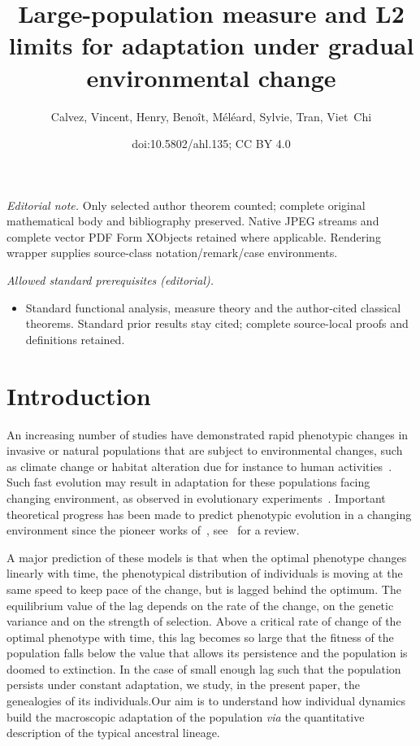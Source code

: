 \documentclass[10pt]{amsart}
\title{Large-population measure and L2 limits for adaptation under gradual environmental change}
\author{Calvez, Vincent, Henry, Benoît, Méléard, Sylvie, Tran, Viet Chi}
\date{doi:10.5802/ahl.135; CC BY 4.0}
\theoremstyle{definition}\newtheorem{defi}[theo]{Definition}\newtheorem{rema}[theo]{Remark}\newtheorem{exam}[theo]{Example}\newtheorem{exem}[theo]{Example}\newtheorem{nota}[theo]{Notation}
\begin{document}
\maketitle
\noindent\textit{Editorial note.} Only selected author theorem counted; complete original mathematical body and bibliography preserved. Native JPEG streams and complete vector PDF Form XObjects retained where applicable. Rendering wrapper supplies source-class notation/remark/case environments.\par\medskip
\noindent\textit{Allowed standard prerequisites (editorial).}\begin{itemize}
\item Standard functional analysis, measure theory and the author-cited classical theorems. Standard prior results stay cited; complete source-local proofs and definitions retained.
\end{itemize}\medskip



\section{Introduction}

An increasing number of studies have demonstrated rapid phenotypic changes in invasive or natural populations that are subject to environmental changes, such as climate change or habitat alteration due for instance to human activities~\cite{anderson_evolutionary_2012,BraHol06,burrows_pace_2011,Hen08,HofSgr11,Par06,sheldon_climate_2019}. Such fast evolution may result in adaptation for these populations facing changing environment, as observed in evolutionary experiments~\cite{Col18,GorAarZwa16,guzella_slower_2018,Gon13}. Important theoretical progress has been made to predict phenotypic evolution in a changing environment since the pioneer works of~\cite{BurLyn95,LynGabWoo91,LynLan93,LanSha96}, see~\cite{KopMat13} for a review.



A major prediction of these models is that when the optimal phenotype changes linearly with time, the phenotypical distribution of individuals is moving at the same speed to keep pace of the change, but is lagged behind the optimum. The equi\-librium value of the lag depends on the rate of the change, on the genetic variance and on the strength of selection. Above a critical rate of change of the optimal phenotype with time, this lag becomes so large that the fitness of the population falls below the value that allows its persistence and the population is doomed to extinction. In the case of small enough lag such that the population persists under constant adaptation, we study, in the present paper, the genealogies of its individuals.\linebreak Our aim is to understand how individual dynamics build the macroscopic adaptation of the population \emph{via} the quantitative description of the typical ancestral lineage.
\end{document}
